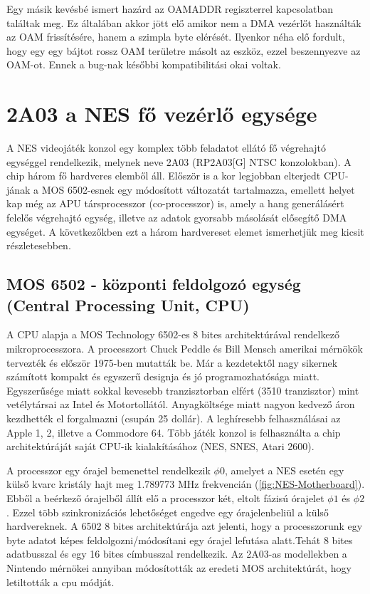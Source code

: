  	 Egy másik kevésbé ismert hazárd az OAMADDR regiszterrel kapcsolatban találtak meg. Ez általában akkor jött elő amikor nem a DMA vezérlőt használták az OAM frissítésére, hanem a szimpla byte elérését. Ilyenkor néha elő fordult, hogy egy egy bájtot rossz OAM területre másolt az eszköz, ezzel beszennyezve az OAM-ot. Ennek a bug-nak későbbi kompatibilitási okai voltak.    
 	 
 	       
\section{2A03 a NES fő vezérlő egysége}

A NES videojáték konzol egy komplex több feladatot ellátó fő végrehajtó egységgel rendelkezik, melynek neve 2A03 (RP2A03[G] NTSC konzolokban). A chip három fő hardveres elemből áll. Először is a kor legjobban elterjedt CPU-jának a MOS 6502-esnek egy módosított változatát tartalmazza, emellett helyet kap még az APU társprocesszor (co-processzor) is, amely a hang generálásért felelős végrehajtó egység, illetve az adatok gyorsabb másolását elősegítő DMA egységet. A következőkben ezt a három hardvereset elemet ismerhetjük meg kicsit részletesebben.

	\subsection{MOS 6502 - központi feldolgozó egység (Central Processing Unit, CPU)}
	
	A CPU alapja a MOS Technology 6502-es 8 bites architektúrával rendelkező mikroprocesszora. A processzort Chuck Peddle és Bill Mensch amerikai mérnökök tervezték és először 1975-ben mutatták be. Már a kezdetektől nagy sikernek számított kompakt és egyszerű designja és jó programozhatósága miatt. Egyszerűsége miatt sokkal kevesebb tranzisztorban elfért (3510 tranzisztor) mint vetélytársai az Intel és Motortollától. Anyagköltsége miatt nagyon kedvező áron kezdhették el forgalmazni (csupán 25 dollár). A leghíresebb felhasználásai az Apple 1, 2, illetve a Commodore 64. Több játék konzol is felhasználta a chip architektúráját saját CPU-ik kialakításához (NES, SNES, Atari 2600). 
	
	A processzor egy órajel bemenettel rendelkezik $\phi0$, amelyet a NES esetén egy külső kvarc kristály hajt meg 1.789773 MHz frekvencián (\ref{fig:NES-Motherboard}). Ebből a beérkező órajelből állít elő a processzor két, eltolt fázisú órajelet $\phi1$ és $\phi2$. Ezzel több szinkronizációs lehetőséget engedve egy órajelenbeliül a külső hardvereknek. A 6502 8 bites architektúrája azt jelenti, hogy a processzorunk egy byte adatot képes feldolgozni/módosítani egy órajel lefutása alatt.Tehát 8 bites adatbusszal és egy 16 bites címbusszal rendelkezik. Az 2A03-as modellekben a Nintendo mérnökei annyiban módosították az eredeti MOS architektúrát, hogy letiltották a cpu módját.

